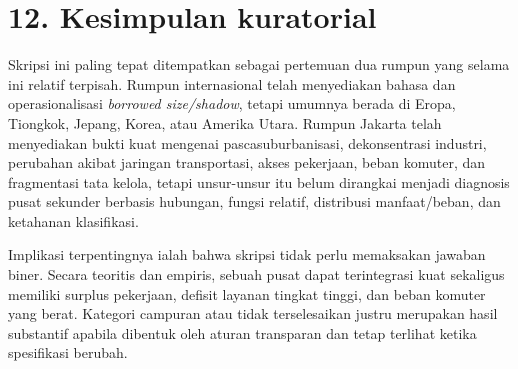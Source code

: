 \documentclass[
  indonesian,
  11pt,
  a4paper,
  oneside,
  openany]{report}
\begin{document}
\section{12. Kesimpulan kuratorial}\label{kesimpulan-kuratorial}

Skripsi ini paling tepat ditempatkan sebagai pertemuan dua rumpun yang
selama ini relatif terpisah. Rumpun internasional telah menyediakan
bahasa dan operasionalisasi \emph{borrowed size/shadow}, tetapi umumnya
berada di Eropa, Tiongkok, Jepang, Korea, atau Amerika Utara. Rumpun
Jakarta telah menyediakan bukti kuat mengenai pascasuburbanisasi,
dekonsentrasi industri, perubahan akibat jaringan transportasi, akses
pekerjaan, beban komuter, dan fragmentasi tata kelola, tetapi
unsur-unsur itu belum dirangkai menjadi diagnosis pusat sekunder
berbasis hubungan, fungsi relatif, distribusi manfaat/beban, dan
ketahanan klasifikasi.

Implikasi terpentingnya ialah bahwa skripsi tidak perlu memaksakan
jawaban biner. Secara teoritis dan empiris, sebuah pusat dapat
terintegrasi kuat sekaligus memiliki surplus pekerjaan, defisit layanan
tingkat tinggi, dan beban komuter yang berat. Kategori campuran atau
tidak terselesaikan justru merupakan hasil substantif apabila dibentuk
oleh aturan transparan dan tetap terlihat ketika spesifikasi berubah.
\end{document}
